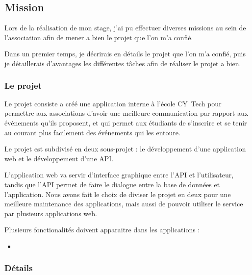 \subsection{Mission}

Lors de la réalisation de mon stage, j'ai pu effectuer diverses missions au sein de l'association afin de mener a bien le projet que l'on m'a confié.

Dans un premier temps, je décrirais en détails le projet que l'on m'a confié, puis je détaillerais d'avantages les différentes tâches afin de réaliser le projet a bien.

\subsubsection{Le projet}

Le projet consiste a créé une application interne à l'école CY~Tech pour permettre aux associations d'avoir une meilleure communication par rapport aux événements qu'ils proposent, et qui permet aux étudiants de s'inscrire et se tenir au courant plus facilement des événements qui les entoure.

Le projet est subdivisé en deux sous-projet : le développement d'une application web et le développement d'une API.

L'application web va servir d'interface graphique entre l'API et l'utilisateur, tandis que l'API permet de faire le dialogue entre la base de données et l'application. Nous avons fait le choix de diviser le projet en deux pour une meilleure maintenance des applications, mais aussi de pouvoir utiliser le service par plusieurs applications web.

Plusieurs fonctionalités doivent apparaitre dans les applications :
\begin{itemize}
	\item 
\end{itemize}

\subsubsection{Détails}